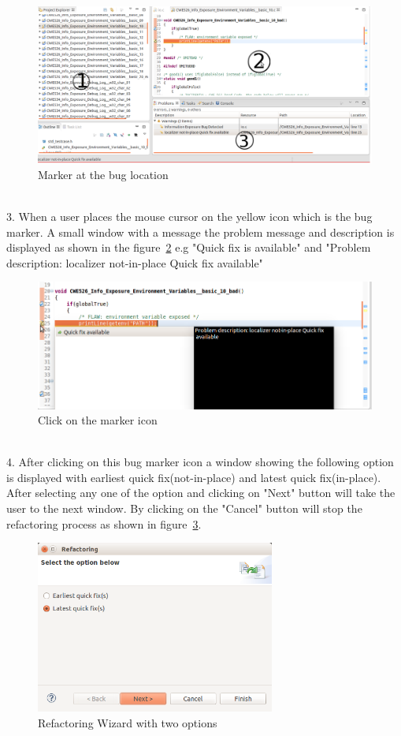 \begin{figure}[!htb]
\centering
\includegraphics[width=1.0\textwidth]{png/Tool2.png}
\caption{Marker at the bug location}
\label{fig:tool2}
\end{figure}\\
3. When a user places the mouse cursor on the yellow icon which is the bug marker. A small window with a message 
the problem message and description is displayed as shown in the figure~\ref{fig:tool3} e.g "Quick fix is available"
and "Problem description: localizer not-in-place Quick fix available"\\
\begin{figure}[!htb]
\centering
\includegraphics[width=1.0\textwidth]{png/Tool3.png}
\caption{Click on the marker icon}
\label{fig:tool3}
\end{figure}\\
4. After clicking on this bug marker icon a window showing the following option is displayed with
earliest quick fix(not-in-place) and latest quick fix(in-place). After selecting any one of the option
and clicking on "Next" button will take the user to the next window. By clicking on the "Cancel" button
will stop the refactoring process as shown in figure~\ref{fig:tool4}.\\
\begin{figure}[!htb]
\centering
\includegraphics[width=0.7\textwidth]{png/Tool4.png}
\caption{Refactoring Wizard with two options}
\label{fig:tool4}
\end{figure}\\
